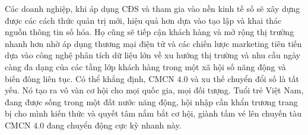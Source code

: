 \begin{multicols}{2}
	\vskip 0.1cm
	Các doanh nghiệp, khi áp dụng CĐS và tham gia vào nền kinh tế số sẽ xây dựng được các cách thức quản trị mới, hiệu quả hơn dựa vào tạo lập và khai thác nguồn thông tin số hóa. Họ cũng sẽ tiếp cận khách hàng và mở rộng thị trường nhanh hơn nhờ áp dụng thương mại điện tử và các chiến lược marketing tiên tiến dựa vào công nghệ phân tích dữ liệu lớn về xu hướng thị trường và nhu cầu ngày càng đa dạng của các tầng lớp khách hàng trong một xã hội số năng động và biến đông liên tục.
	\vskip 0.1cm
	Có thể khẳng định, CMCN $4{.}0$ và xu thế chuyển đổi số là tất yếu. Nó tạo ra vô vàn cơ hội cho mọi quốc gia, mọi đối tượng. Tuổi trẻ Việt Nam, đang được sống trong một đất nước năng động, hội nhập cần khẩn trương trang bị cho mình kiến thức và quyết tâm nắm bắt cơ hội, giành tấm vé lên chuyến tàu CMCN $4{.}0$ đang chuyển động cực kỳ nhanh này.
\end{multicols}
%
%
%
